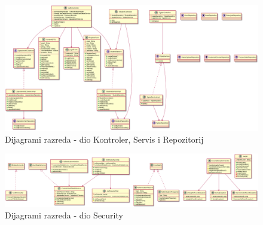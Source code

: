 			\begin{figure}[H]
				\includegraphics[scale=0.3]{dijagrami/controller.png} %
				\centering
				\caption{Dijagrami razreda - dio Kontroler, Servis i Repozitorij}
				\label{fig:controller}
			\end{figure}
		
			\begin{figure}[H]
				\includegraphics[scale=0.3]{dijagrami/security.png} %
				\centering
				\caption{Dijagrami razreda - dio Security}
				\label{fig:security}
			\end{figure}
		
		
